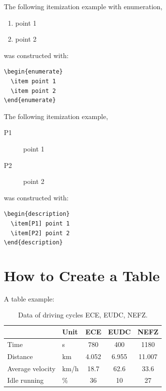 The following itemization example with enumeration,
\begin{enumerate}
  \item point 1
  \item point 2
\end{enumerate}
was constructed with:
\begin{verbatim}
\begin{enumerate}
  \item point 1
  \item point 2
\end{enumerate}
\end{verbatim}

The following itemization example,
\begin{description}
  \item[P1] point 1
  \item[P2] point 2
\end{description}
was constructed with:
\begin{verbatim}
\begin{description}
  \item[P1] point 1
  \item[P2] point 2
\end{description}
\end{verbatim}


\section{How to Create a Table}\label{sec:tables}

A table example:
\begin{table}[h]
\begin{center}
 \label{tab:tabnefz}
 \begin{tabular}{ll|ccc}
 \hline
  & Unit & ECE & EUDC & NEFZ \\ \hline \hline
 Time & s & 780 & 400 & 1180 \\
 Distance & km & 4.052 & 6.955 & 11.007 \\
 Average velocity & km/h & 18.7 &  62.6 & 33.6 \\
 Idle running & \% & 36 & 10 & 27 \\
 \hline
 \end{tabular}
 \caption{Data of driving cycles ECE, EUDC, NEFZ.}
\end{center}
\end{table}

